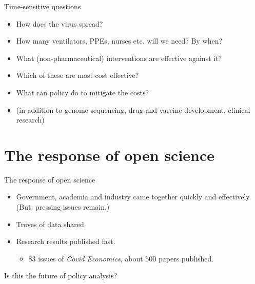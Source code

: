 \documentclass[ignorenonframetext,aspectratio=54,]{beamer}
\providecommand{\tightlist}{%
  \setlength{\itemsep}{0pt}\setlength{\parskip}{0pt}}
\begin{document}
\begin{frame}{Time-sensitive questions}
\protect\hypertarget{time-sensitive-questions}{}

\begin{itemize}
\tightlist
\item
  How does the virus spread?
\item
  How many ventilators, PPEs, nurses etc. will we need? By when?
\item
  What (non-pharmaceutical) interventions are effective against it?
\item
  Which of these are most cost effective?
\item
  What can policy do to mitigate the costs?
\item
  (in addition to genome sequencing, drug and vaccine development,
  clinical research)
\end{itemize}

\end{frame}

\hypertarget{the-response-of-open-science}{%
\section{The response of open
science}\label{the-response-of-open-science}}

\begin{frame}{The response of open science}
\protect\hypertarget{the-response-of-open-science-1}{}

\begin{itemize}
\tightlist
\item
  Government, academia and industry came together quickly and
  effectively. (But: pressing issues remain.)
\item
  Troves of data shared.
\item
  Research results published fast.

  \begin{itemize}
  \tightlist
  \item
    83 issues of \emph{Covid Economics}, about 500 papers published.
  \end{itemize}
\end{itemize}

\begin{block}{Is this the future of policy analysis?}

\end{block}

\end{frame}
\end{document}
